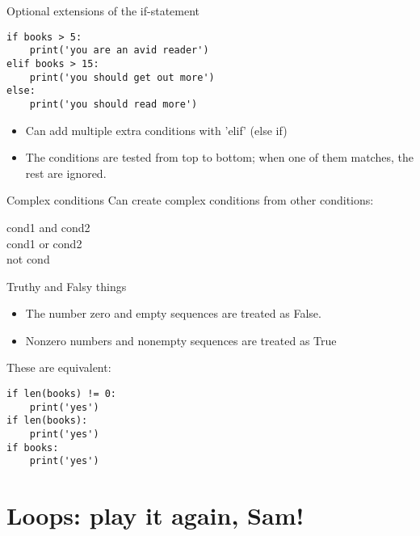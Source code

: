 \documentclass[aspectratio=169,usenames,dvipsnames]{beamer}
\begin{document}
\begin{frame}[fragile]{Optional extensions of the if-statement}
\begin{lstlisting}
if books > 5:
    print('you are an avid reader')
elif books > 15:
    print('you should get out more')
else:
    print('you should read more')
\end{lstlisting}

\begin{itemize}
    \item Can add multiple extra conditions with 'elif' (else if)
    \item The conditions are tested from top to bottom;
            when one of them matches, the rest are ignored.
\end{itemize}
\end{frame}


\begin{frame}{Complex conditions}
    Can create complex conditions from other conditions:
    
    \begin{description}
        \item[cond1 and cond2]
        \item[cond1 or cond2]
        \item[not cond]
    \end{description}

\end{frame}

\begin{frame}[fragile]{Truthy and Falsy things}
\begin{itemize}
\item The number zero and empty sequences are treated as False.
\item Nonzero numbers and nonempty sequences are treated as True
\end{itemize}

These are equivalent:
\begin{lstlisting}
if len(books) != 0:
    print('yes')    
if len(books):
    print('yes')    
if books:
    print('yes')    
\end{lstlisting}

\end{frame}


\section{Loops: play it again, Sam!}
\frame{\tableofcontents[currentsection]}
\end{document}
